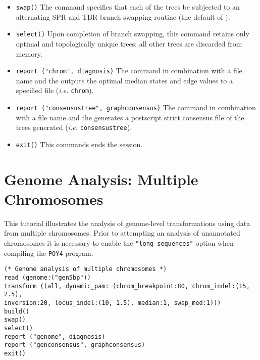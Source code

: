 \begin{itemize}
\item \texttt{swap()} The  command specifies that each of the trees be subjected to an alternating SPR and TBR branch swapping routine (the default of \poy).
\item \texttt{select()} Upon completion of branch swapping, this command retains only optimal and topologically unique trees; all other trees are discarded from memory. 
\item \texttt{report ("chrom", diagnosis)}  The  command in combination with a file name and the  outputs the optimal median states and edge values to a specified file (\emph{i.e.} \texttt{chrom}). 
\item \texttt{report ("consensustree", graphconsensus)}  The  command in combination with a file name and the  generates a postscript strict consensus file of the trees generated (\emph{i.e.} \texttt{consensustree}). 
\item \texttt{exit()} This commands ends the \poy session.
\end{itemize}


\section{Genome Analysis: Multiple Chromosomes}{\label{tutorial 6}}

This tutorial illustrates the analysis of genome-level transformations using data from multiple chromosomes. 
Prior to attempting an analysis of unannotated chromosomes it is necessary to enable the \texttt {"long sequences"}
option when compiling the \texttt{POY4} program. 

\begin{verbatim}
(* Genome analysis of multiple chromosomes *)
read (genome:("gen5bp"))
transform ((all, dynamic_pam: (chrom_breakpoint:80, chrom_indel:(15, 2.5), 
inversion:20, locus_indel:(10, 1.5), median:1, swap_med:1)))
build()
swap()
select()
report ("genome", diagnosis)
report ("genconsensus", graphconsensus)
exit()
\end{verbatim}

